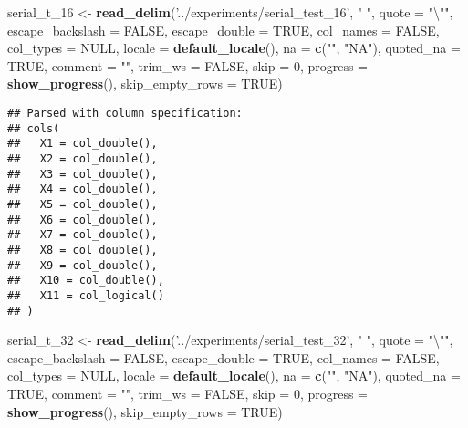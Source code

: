 \documentclass[]{article}
\newenvironment{Shaded}{\begin{snugshade}}{\end{snugshade}}
\newcommand{\KeywordTok}[1]{\textcolor[rgb]{0.13,0.29,0.53}{\textbf{#1}}}
\newcommand{\DataTypeTok}[1]{\textcolor[rgb]{0.13,0.29,0.53}{#1}}
\newcommand{\DecValTok}[1]{\textcolor[rgb]{0.00,0.00,0.81}{#1}}
\newcommand{\CharTok}[1]{\textcolor[rgb]{0.31,0.60,0.02}{#1}}
\newcommand{\StringTok}[1]{\textcolor[rgb]{0.31,0.60,0.02}{#1}}
\newcommand{\OtherTok}[1]{\textcolor[rgb]{0.56,0.35,0.01}{#1}}
\newcommand{\NormalTok}[1]{#1}
\begin{document}
\begin{Shaded}
\begin{Highlighting}[]
\NormalTok{serial_t_}\DecValTok{16}\NormalTok{ <-}\StringTok{ }\KeywordTok{read_delim}\NormalTok{(}\StringTok{'../experiments/serial_test_16'}\NormalTok{, }\StringTok{" "}\NormalTok{, }\DataTypeTok{quote =} \StringTok{"}\CharTok{\textbackslash{}"}\StringTok{"}\NormalTok{, }\DataTypeTok{escape_backslash =} \OtherTok{FALSE}\NormalTok{,}
  \DataTypeTok{escape_double =} \OtherTok{TRUE}\NormalTok{, }\DataTypeTok{col_names =} \OtherTok{FALSE}\NormalTok{, }\DataTypeTok{col_types =} \OtherTok{NULL}\NormalTok{,}
  \DataTypeTok{locale =} \KeywordTok{default_locale}\NormalTok{(), }\DataTypeTok{na =} \KeywordTok{c}\NormalTok{(}\StringTok{""}\NormalTok{, }\StringTok{"NA"}\NormalTok{), }\DataTypeTok{quoted_na =} \OtherTok{TRUE}\NormalTok{,}
  \DataTypeTok{comment =} \StringTok{""}\NormalTok{, }\DataTypeTok{trim_ws =} \OtherTok{FALSE}\NormalTok{, }\DataTypeTok{skip =} \DecValTok{0}\NormalTok{, }
 \DataTypeTok{progress =} \KeywordTok{show_progress}\NormalTok{(),}
  \DataTypeTok{skip_empty_rows =} \OtherTok{TRUE}\NormalTok{)}
\end{Highlighting}
\end{Shaded}

\begin{verbatim}
## Parsed with column specification:
## cols(
##   X1 = col_double(),
##   X2 = col_double(),
##   X3 = col_double(),
##   X4 = col_double(),
##   X5 = col_double(),
##   X6 = col_double(),
##   X7 = col_double(),
##   X8 = col_double(),
##   X9 = col_double(),
##   X10 = col_double(),
##   X11 = col_logical()
## )
\end{verbatim}

\begin{Shaded}
\begin{Highlighting}[]
\NormalTok{serial_t_}\DecValTok{32}\NormalTok{ <-}\StringTok{ }\KeywordTok{read_delim}\NormalTok{(}\StringTok{'../experiments/serial_test_32'}\NormalTok{, }\StringTok{" "}\NormalTok{, }\DataTypeTok{quote =} \StringTok{"}\CharTok{\textbackslash{}"}\StringTok{"}\NormalTok{, }\DataTypeTok{escape_backslash =} \OtherTok{FALSE}\NormalTok{,}
  \DataTypeTok{escape_double =} \OtherTok{TRUE}\NormalTok{, }\DataTypeTok{col_names =} \OtherTok{FALSE}\NormalTok{, }\DataTypeTok{col_types =} \OtherTok{NULL}\NormalTok{,}
  \DataTypeTok{locale =} \KeywordTok{default_locale}\NormalTok{(), }\DataTypeTok{na =} \KeywordTok{c}\NormalTok{(}\StringTok{""}\NormalTok{, }\StringTok{"NA"}\NormalTok{), }\DataTypeTok{quoted_na =} \OtherTok{TRUE}\NormalTok{,}
  \DataTypeTok{comment =} \StringTok{""}\NormalTok{, }\DataTypeTok{trim_ws =} \OtherTok{FALSE}\NormalTok{, }\DataTypeTok{skip =} \DecValTok{0}\NormalTok{, }
 \DataTypeTok{progress =} \KeywordTok{show_progress}\NormalTok{(),}
  \DataTypeTok{skip_empty_rows =} \OtherTok{TRUE}\NormalTok{)}
\end{Highlighting}
\end{Shaded}
\end{document}
